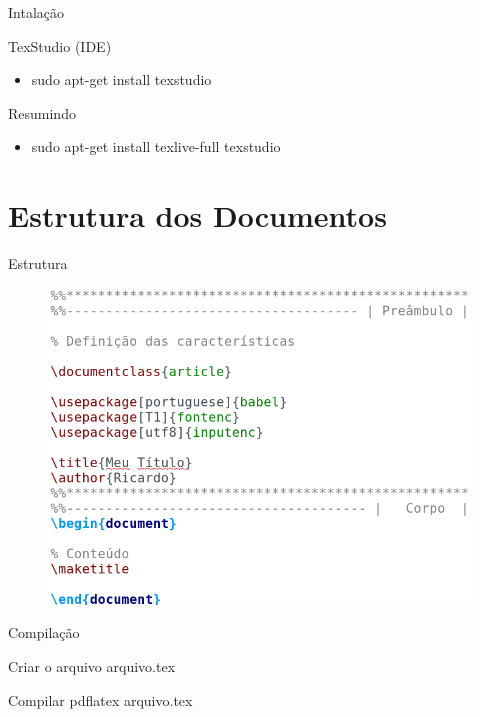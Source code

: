 \documentclass{beamer}
\begin{document}
\begin{frame}{Intalação}

	\begin{block}{TexStudio (IDE)}
		\begin{itemize}
			\item sudo apt-get install texstudio
		\end{itemize}
	\end{block}
	
	

	\begin{block}{Resumindo}
		\begin{itemize}
			\item sudo apt-get install texlive-full texstudio 
		\end{itemize}
	\end{block}

\end{frame}


\section{Estrutura dos Documentos}

\begin{frame}{Estrutura}

	\begin{figure}[!htb]
		\centering
		\includegraphics[scale=.4]{estrutura.png}
	\end{figure}

\end{frame}


\begin{frame}{Compilação}
	
	\begin{itemize}
		\begin{block}{Criar o arquivo}
			arquivo.tex
		\end{block}
	
		\begin{block}{Compilar}
			pdflatex arquivo.tex
		\end{block}
		
	\end{itemize}

\end{frame}
\end{document}
